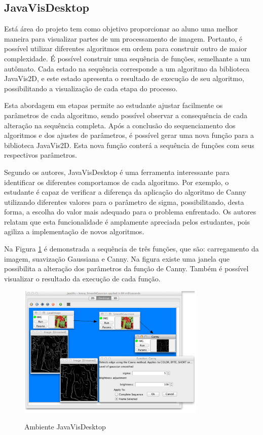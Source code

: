 \documentclass[
	12pt,				%
	oneside,			%
	a4paper,			%
	english,			%
	french,				%
	spanish,			%
	brazil,				%
	]{abntex2}
\begin{document}
\subsection{JavaVisDesktop}

Está área do projeto tem como objetivo proporcionar ao aluno uma melhor maneira para visualizar partes de um processamento de imagem. Portanto, é possível utilizar diferentes algoritmos em ordem para construir outro de maior complexidade. É possível construir uma sequência de funções, semelhante a um autômato. Cada estado na sequência corresponde a um algoritmo da biblioteca JavaVis2D, e este estado apresenta o resultado de execução de seu algoritmo, possibilitando a visualização de cada etapa do processo.

Esta abordagem em etapas permite ao estudante ajustar facilmente os parâmetros de cada algoritmo, sendo possível observar a consequência de cada alteração na sequência completa. Após a conclusão do sequenciamento dos algoritmos e dos ajustes de parâmetros, é possível gerar uma nova função para a biblioteca JavaVis2D. Esta nova função conterá a sequência de funções com seus respectivos parâmetros.

Segundo os autores, JavaVisDesktop é uma ferramenta interessante para identificar os diferentes comportamos de cada algoritmo. Por exemplo, o estudante é capaz de verificar a diferença da aplicação do algoritmo de Canny utilizando diferentes valores para o parâmetro de sigma, possibilitando, desta forma, a escolha do valor mais adequado para o problema enfrentado. Os autores relatam que esta funcionalidade é amplamente apreciada pelos estudantes, pois agiliza a implementação de novos algoritmos.

Na Figura \ref{fig:javavis_desktop} é demonstrada a sequência de três funções, que são: carregamento da imagem, suavização Gaussiana e Canny. Na figura existe uma janela que possibilita a alteração dos parâmetros da função de Canny. Também é possível visualizar o resultado da execução de cada função.

\begin{figure}[ht]
\centering
\caption{Ambiente JavaVisDesktop}
\includegraphics[width=0.8\textwidth]{imagens/javavis_desktop.png}
\label{fig:javavis_desktop}
\end{figure}
\end{document}
